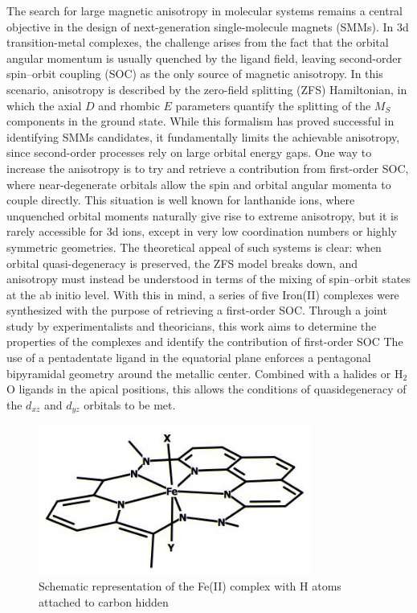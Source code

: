 \documentclass[12pt]{report}
\numberwithin{equation}{section}
\begin{document}
The search for large magnetic anisotropy in molecular systems remains a central objective in the design of next-generation single-molecule magnets (SMMs).
In 3d transition-metal complexes, the challenge arises from the fact that the orbital angular momentum is usually quenched by the ligand field, leaving second-order spin–orbit coupling (SOC) as the only source of magnetic anisotropy.
In this scenario, anisotropy is described by the zero-field splitting (ZFS) Hamiltonian, in which the axial $D$ and rhombic $E$ parameters quantify the splitting of the $M_S$ components in the ground state.
While this formalism has proved successful in identifying SMMs candidates, it fundamentally limits the achievable anisotropy, since second-order processes rely on large orbital energy gaps.
One way to increase the anisotropy is to try and retrieve a contribution from first-order SOC, where near-degenerate orbitals allow the spin and orbital angular momenta to couple directly.
This situation is well known for lanthanide ions, where unquenched orbital moments naturally give rise to extreme anisotropy, but it is rarely accessible for 3d ions, except in very low coordination numbers or highly symmetric geometries.
The theoretical appeal of such systems is clear: when orbital quasi-degeneracy is preserved, the ZFS model breaks down, and anisotropy must instead be understood in terms of the mixing of spin–orbit states at the ab initio level.
With this in mind, a series of five Iron(II) complexes were synthesized with the purpose of retrieving a first-order SOC.
Through a joint study by experimentalists and theoricians, this work aims to determine the properties of the complexes and identify the contribution of first-order SOC
The use of a pentadentate ligand in the equatorial plane enforces a pentagonal bipyramidal geometry around the metallic center.
Combined with a halides or H$_2$O ligands in the apical positions, this allows the conditions of quasidegeneracy of the $d_{xz}$ and $d_{yz}$ orbitals to be met.
\begin{figure}[!ht]
    \centering
    \includegraphics[width=0.8\textwidth]{Images/ComplexFe.XY.jpg}
    \caption{Schematic representation of the Fe(II) complex with H atoms attached to carbon hidden}
    \label{FeComplex}
\end{figure}
\end{document}
